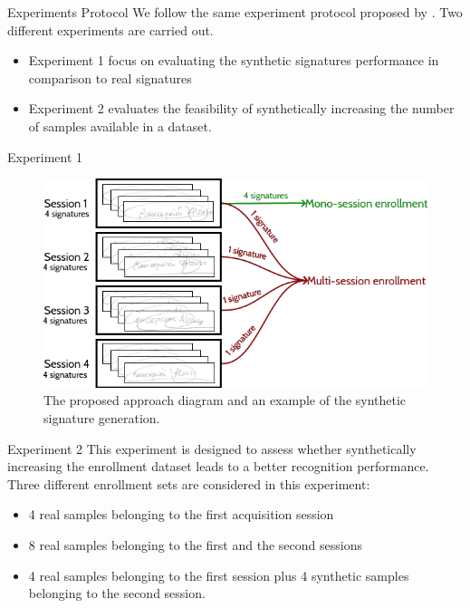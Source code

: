 \documentclass{beamer}
\begin{document}
\begin{frame}{Experiments Protocol}
We follow the same experiment protocol proposed by \cite{diaz2014generation}. 
Two different experiments are carried out. 

\begin{itemize}
\item Experiment 1 focus on evaluating the synthetic signatures performance in comparison to real signatures
\item Experiment 2 evaluates the feasibility of synthetically increasing the number of samples available in a dataset.
\end{itemize}
\end{frame}

\begin{frame}{Experiment 1}
\begin{figure}[!htb]
\centering
\includegraphics[width=\textwidth]{multi-and-mono}
\caption{The proposed approach diagram and an example of the synthetic signature generation.}
\label{fig:multiandmono}
\end{figure}
\end{frame}

\begin{frame}{Experiment 2}
This experiment is designed to assess whether synthetically increasing the enrollment dataset leads to a better recognition performance. Three different enrollment sets are considered in this experiment: 
\begin{itemize}
  \item 4 real samples belonging to the
  first acquisition session
  \item 8 real samples belonging to the first and
  the second sessions
  \item 4 real samples belonging
  to the first session plus 4 synthetic samples belonging
  to the second session.
\end{itemize}
\end{frame}
\end{document}
